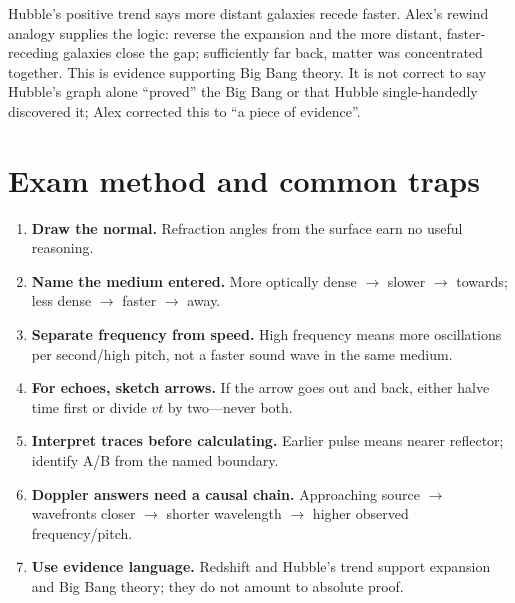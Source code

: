 \documentclass[11pt,a4paper]{article}
\begin{document}
Hubble's positive trend says more distant galaxies recede faster. Alex's rewind analogy supplies the logic: reverse the expansion and the more distant, faster-receding galaxies close the gap; sufficiently far back, matter was concentrated together. This is evidence supporting Big Bang theory. It is not correct to say Hubble's graph alone ``proved'' the Big Bang or that Hubble single-handedly discovered it; Alex corrected this to ``a piece of evidence''.

\section{Exam method and common traps}
\begin{enumerate}
\item \textbf{Draw the normal.} Refraction angles from the surface earn no useful reasoning.
\item \textbf{Name the medium entered.} More optically dense $\to$ slower $\to$ towards; less dense $\to$ faster $\to$ away.
\item \textbf{Separate frequency from speed.} High frequency means more oscillations per second/high pitch, not a faster sound wave in the same medium.
\item \textbf{For echoes, sketch arrows.} If the arrow goes out and back, either halve time first or divide $vt$ by two---never both.
\item \textbf{Interpret traces before calculating.} Earlier pulse means nearer reflector; identify A/B from the named boundary.
\item \textbf{Doppler answers need a causal chain.} Approaching source $\to$ wavefronts closer $\to$ shorter wavelength $\to$ higher observed frequency/pitch.
\item \textbf{Use evidence language.} Redshift and Hubble's trend support expansion and Big Bang theory; they do not amount to absolute proof.
\end{enumerate}
\end{document}

